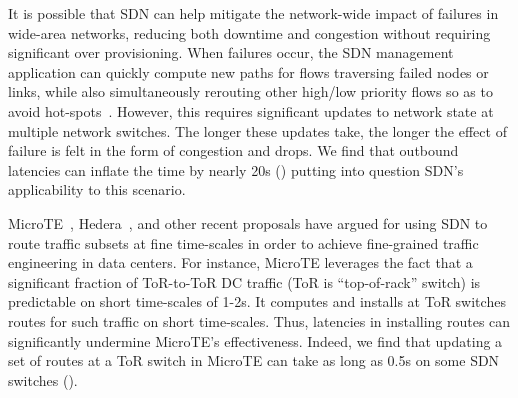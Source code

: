 

It is possible that SDN can help mitigate the network-wide impact of
failures in wide-area networks, reducing both downtime and congestion
without requiring significant over provisioning. When failures occur,
the SDN management application can quickly compute new paths for flows
traversing failed nodes or links, while also simultaneously rerouting
other high/low priority flows so as to avoid hot-spots~\cite{swan}.
However, this requires significant updates to network state at
multiple network switches. The longer these updates take, the longer
the effect of failure is felt in the form of congestion and drops. We
find that outbound latencies can inflate the time by nearly 20s
() putting into question SDN's applicability to
this scenario. 

Micro\-TE~\cite{microte}, Hedera~\cite{hedera}, and other recent proposals have
argued for using SDN to route traffic subsets at fine time-scales in order to
achieve fine-grained traffic engineering in data centers. For instance,
MicroTE leverages the fact that a significant fraction of ToR-to-ToR DC
traffic (ToR is ``top-of-rack'' switch) is predictable on short time-scales
of 1-2s. It computes and installs at ToR switches routes for such traffic
on short time-scales. %
Thus, latencies in installing routes can significantly undermine MicroTE's
effectiveness. Indeed, we find that updating a set of routes at a ToR switch
in MicroTE can take as long as 0.5s on some SDN switches
(). 

